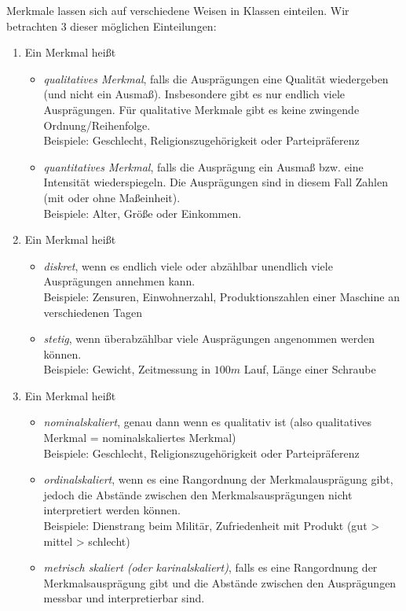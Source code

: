 \documentclass{scrreprt}
\begin{document}
 Merkmale lassen sich auf verschiedene Weisen in Klassen einteilen. Wir betrachten 3 dieser möglichen Einteilungen:
\begin{enumerate}[label=(\Alph*)]
\item Ein Merkmal heißt
\begin{itemize}
\item \emph{qualitatives Merkmal}, falls die Ausprägungen eine Qualität wiedergeben (und nicht ein Ausmaß). Insbesondere gibt es nur endlich viele Ausprägungen. Für qualitative Merkmale gibt es keine zwingende Ordnung/Reihenfolge.\\
Beispiele: Geschlecht, Religionszugehörigkeit oder Parteipräferenz
\item \emph{quantitatives Merkmal}, falls die Ausprägung ein Ausmaß bzw. eine Intensität wiederspiegeln. Die Ausprägungen sind in diesem Fall Zahlen (mit oder ohne Maßeinheit).\\
Beispiele: Alter, Größe oder Einkommen.
\end{itemize}
\item Ein Merkmal heißt
\begin{itemize}
\item \emph{diskret}, wenn es endlich viele oder abzählbar unendlich viele Ausprägungen annehmen kann.\\
Beispiele: Zensuren, Einwohnerzahl, Produktionszahlen einer Maschine an verschiedenen Tagen
\item \emph{stetig}, wenn überabzählbar viele Ausprägungen angenommen werden können.\\
Beispiele: Gewicht, Zeitmessung in $100\unit{m}$ Lauf, Länge einer Schraube
\end{itemize}
\item Ein Merkmal heißt
\begin{itemize}
\item \emph{nominalskaliert}, genau dann wenn es qualitativ ist (also qualitatives Merkmal = nominalskaliertes Merkmal)\\
Beispiele: Geschlecht, Religionszugehörigkeit oder Parteipräferenz
\item \emph{ordinalskaliert}, wenn es eine Rangordnung der Merkmalausprägung gibt, jedoch die Abstände zwischen den Merkmalsausprägungen nicht interpretiert werden können.\\
Beispiele: Dienstrang beim Militär, Zufriedenheit mit Produkt (gut > mittel > schlecht)
\item \emph{metrisch skaliert (oder karinalskaliert)}, falls es eine Rangordnung der Merkmalsausprägung gibt und die Abstände zwischen den Ausprägungen messbar und interpretierbar sind.\\

\end{itemize}
\end{enumerate}
\end{document}

